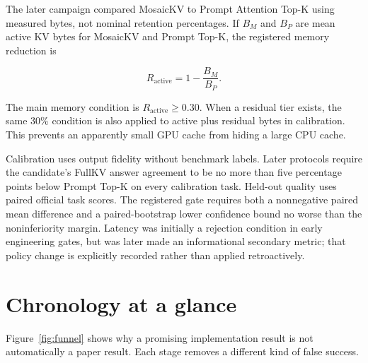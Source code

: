 \documentclass[11pt]{article}
\begin{document}
The later campaign compared MosaicKV to Prompt Attention Top-K using measured bytes, not nominal
retention percentages.  If $B_M$ and $B_P$ are mean active KV bytes for MosaicKV and Prompt Top-K,
the registered memory reduction is

\begin{equation}
  R_{\mathrm{active}} = 1 - \frac{B_M}{B_P}.
\end{equation}

The main memory condition is $R_{\mathrm{active}}\ge 0.30$.  When a residual tier exists, the same
30\% condition is also applied to active plus residual bytes in calibration.  This prevents an
apparently small GPU cache from hiding a large CPU cache.

Calibration uses output fidelity without benchmark labels.  Later protocols require the
candidate's FullKV answer agreement to be no more than five percentage points below Prompt Top-K
on every calibration task.  Held-out quality uses paired official task scores.  The registered
gate requires both a nonnegative paired mean difference and a paired-bootstrap lower confidence
bound no worse than the noninferiority margin.  Latency was initially a rejection condition in
early engineering gates, but was later made an informational secondary metric; that policy change
is explicitly recorded rather than applied retroactively.

\section{Chronology at a glance}

Figure~\ref{fig:funnel} shows why a promising implementation result is not automatically a paper
result.  Each stage removes a different kind of false success.
\end{document}
